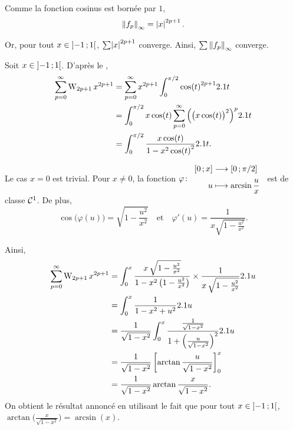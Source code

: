 \begin{solution}
\begin{reponses}
\item Comme la fonction cosinus est bornée par $1$,
\[
\norm{f_p}_{\infty} = \mathopen{}\left| x \right|^{2p+1}.
\]

Or, pour tout $x \in \left]-1\,;1\right[$, $\sum \mathopen{}\left| x \right|^{2p+1}$ converge. Ainsi, $\sum \norm{f_p}_{\infty}$ converge.

\item Soit $x \in \left]-1\,;1\right[$. D'après le ,
\begin{align*}
\sum_{p=0}^\infty \mathrm{W}_{2p+1} \, x^{2p+1}
&= \sum_{p=0}^\infty x^{2p+1} \int_0^{\pi/2} \cos(t)^{2p+1} 2.1 t\\
&= \int_0^{\pi/2} x\cos(t) \sum_{p=0}^\infty \Big(\big(x\cos(t) \big)^2 \Big)^p 2.1 t \\
&= \int_0^{\pi/2} \frac{x \cos(t)}{1 - x^2 \cos(t)^2} 2.1 t.
\end{align*}

\item Le cas $x = 0$ est trivial. Pour $x \neq 0$, la fonction $\fonction[\varphi]{\interff{0}{x}}{\interff{0}{\pi/2}}{u}{\arcsin\frac{u}{x}}$ est de classe $\mathcal{C}^1$. De plus,
\[
\cos\mathopen{}\big(\varphi(u)\big) = \sqrt{1 - \frac{u^2}{x^2}}
\quad \text{et} \quad 
\varphi'(u) = \frac{1}{x \sqrt{1 - \frac{u^2}{x^2}}}.
\]

Ainsi,
\begin{align*}
\sum_{p=0}^\infty \mathrm{W}_{2p+1} \, x^{2p+1}
&= \int_0^x \frac{x \, \sqrt{1 - \frac{u^2}{x^2}}}{1 - x^2 \left(1 - \frac{u^2}{x^2}\right)} \times \frac{1}{x \, \sqrt{1 - \frac{u^2}{x^2}}}2.1 u \\
&= \int_0^x \frac{1}{1 - x^2 + u^2} 2.1 u\\
&= \frac{1}{\sqrt{1 - x^2}} \int_0^x \frac{\frac{1}{\sqrt{1 - x^2}}}{1 + \left(\frac{u}{\sqrt{1-x^2}}\right)^2} 2.1 u \\
&= \frac{1}{\sqrt{1 - x^2}} \left[ \arctan \frac{u}{\sqrt{1 - x^2}} \right]^x_0 \\
&= \frac{1}{\sqrt{1 - x^2}} \arctan \frac{x}{\sqrt{1 - x^2}}.
\end{align*}
On obtient le résultat annoncé en utilisant le fait que pour tout $x \in \left]-1\,;1\right[$, $\arctan\mathopen{}\Big(\frac{x}{\sqrt{1-x^2}} \Big) = \arcsin(x)$.
\marginnote[-5cm]{

}


\end{reponses}
\end{solution}
